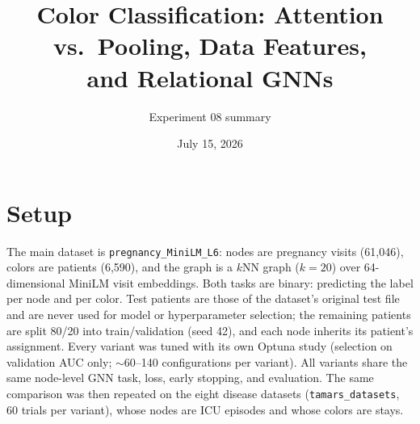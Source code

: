 \documentclass[11pt]{article}
\title{Color Classification: Attention vs.\ Pooling, Data Features,\\ and Relational GNNs}
\author{Experiment 08 summary}
\date{July 15, 2026}
\begin{document}
\maketitle

\section*{Setup}
The main dataset is \texttt{pregnancy\_MiniLM\_L6}: nodes are pregnancy visits (61{,}046), colors are patients (6{,}590), and the graph is a $k$NN graph ($k{=}20$) over 64-dimensional MiniLM visit embeddings. Both tasks are binary: predicting the label per node and per color. Test patients are those of the dataset's original test file and are never used for model or hyperparameter selection; the remaining patients are split 80/20 into train/validation (seed 42), and each node inherits its patient's assignment. Every variant was tuned with its own Optuna study (selection on validation AUC only; $\sim$60--140 configurations per variant). All variants share the same node-level GNN task, loss, early stopping, and evaluation. The same comparison was then repeated on the eight disease datasets (\texttt{tamars\_datasets}, 60 trials per variant), whose nodes are ICU episodes and whose colors are stays.
\end{document}
